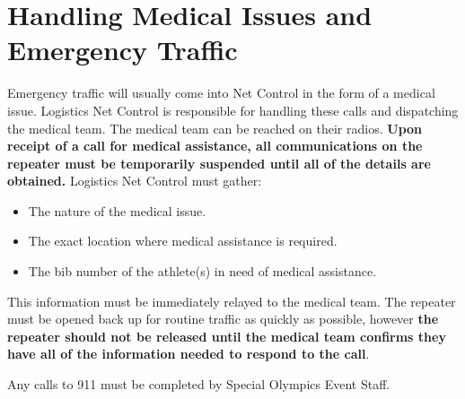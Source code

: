 \documentclass[pdflatex,letterpaper,twoside,12pt]{book}
\begin{document}

\section{Handling Medical Issues and Emergency Traffic}

Emergency traffic will usually come into Net Control in the form of a medical issue.  Logistics Net Control is responsible for handling these calls and dispatching the medical team.  The medical team can be reached on their radios.  \textbf{Upon receipt of a call for medical assistance, all communications on the repeater must be temporarily suspended until all of the details are obtained.}  Logistics Net Control must gather:

\begin{itemize}
	\item The nature of the medical issue.
	\item The exact location where medical assistance is required.
	\item The bib number of the athlete(s) in need of medical assistance.
\end{itemize}

This information must be immediately relayed to the medical team.  The repeater must be opened back up for routine traffic as quickly as possible, however \textbf{the repeater should not be released until the medical team confirms they have all of the information needed to respond to the call}.

Any calls to 911 must be completed by Special Olympics Event Staff.


\iffalse %
We want to change emergencies.. No longer will we hold traffic for nets. We need
to get back to the "Break Break" for emergency traffic, which then we hold only
for the traffic, not until the ER is rectified. We need to work  HARD on getting
Medical onto their own freq. and allowing logistics to handle the ER Dispatch,
etc. We will be having a meeting in January with Leisha and Dave Polaski in
regards. Wold like you to be there also. More to come here as we get closer, but
Were taking control and selling the idea direct to Dave to get his buy in and
push on Dennis. no more Dennis pushing us around. They need to do their job too!
\fi %
\end{document}
